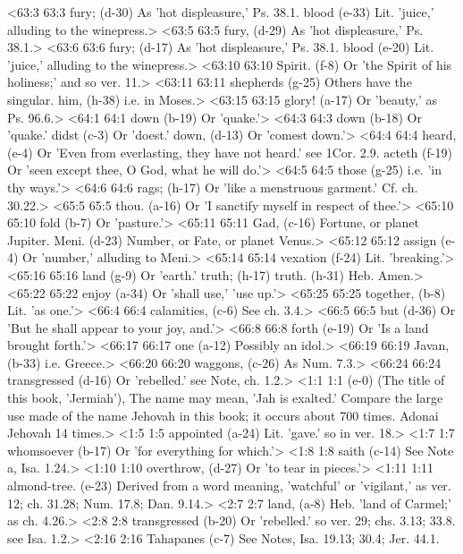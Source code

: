 <63:3 63:3  fury; (d-30)  As 'hot displeasure,' Ps. 38.1.
  blood (e-33)  Lit. 'juice,' alluding to the winepress.>
<63:5 63:5  fury, (d-29)  As 'hot displeasure,' Ps. 38.1.>
<63:6 63:6  fury; (d-17)  As 'hot displeasure,' Ps. 38.1.
  blood (e-20)  Lit. 'juice,' alluding to the winepress.>
<63:10 63:10  Spirit. (f-8)  Or 'the Spirit of his holiness;' and so ver. 11.>
<63:11 63:11  shepherds (g-25)  Others have the singular.
  him, (h-38)  i.e. in Moses.>
<63:15 63:15  glory! (a-17)  Or 'beauty,' as Ps. 96.6.>
<64:1 64:1  down (b-19)  Or 'quake.'>
<64:3 64:3  down (b-18)  Or 'quake.'
  didst (c-3)  Or 'doest.'
  down, (d-13)  Or 'comest down.'>
<64:4 64:4  heard, (e-4)  Or 'Even from everlasting, they have not heard.' see 1Cor. 2.9.
  acteth (f-19)  Or 'seen except thee, O God, what he will do.'>
<64:5 64:5  those (g-25)  i.e. 'in thy ways.'>
<64:6 64:6  rags; (h-17)  Or 'like a menstruous garment.' Cf. ch. 30.22.>
<65:5 65:5  thou. (a-16)  Or 'I sanctify myself in respect of thee.'>
<65:10 65:10  fold (b-7)  Or 'pasture.'>
<65:11 65:11  Gad, (c-16)  Fortune, or planet Jupiter.
  Meni. (d-23)  Number, or Fate, or planet Venus.>
<65:12 65:12  assign (e-4)  Or 'number,' alluding to Meni.>
<65:14 65:14  vexation (f-24)  Lit. 'breaking.'>
<65:16 65:16  land (g-9)  Or 'earth.'
  truth; (h-17)  truth. (h-31)
  Heb. Amen.>
<65:22 65:22  enjoy (a-34)  Or 'shall use,' 'use up.'>
<65:25 65:25  together, (b-8)  Lit. 'as one.'>
<66:4 66:4  calamities, (c-6)  See ch. 3.4.>
<66:5 66:5  but (d-36)  Or 'But he shall appear to your joy, and.'>
<66:8 66:8  forth (e-19)  Or 'Is a land brought forth.'>
<66:17 66:17  one (a-12)  Possibly an idol.>
<66:19 66:19  Javan, (b-33)  i.e. Greece.>
<66:20 66:20  waggons, (c-26)  As Num. 7.3.>
<66:24 66:24  transgressed (d-16)  Or 'rebelled.' see Note, ch. 1.2.>
<1:1 1:1   (e-0)  (The title of this book, 'Jermiah'), The name may mean, 'Jah  is exalted.' Compare the large use made of the name Jehovah  in this book; it occurs about 700 times. Adonai Jehovah 14  times.>
<1:5 1:5  appointed (a-24)  Lit. 'gave.' so in ver. 18.>
<1:7 1:7  whomsoever (b-17)  Or 'for everything for which.'>
<1:8 1:8  saith (c-14)  See Note a, Isa. 1.24.>
<1:10 1:10  overthrow, (d-27)  Or 'to tear in pieces.'>
<1:11 1:11  almond-tree. (e-23)  Derived from a word meaning, 'watchful' or 'vigilant,' as  ver. 12; ch. 31.28; Num. 17.8; Dan. 9.14.>
<2:7 2:7  land, (a-8)  Heb. 'land of Carmel;' as ch. 4.26.>
<2:8 2:8  transgressed (b-20)  Or 'rebelled.' so ver. 29; chs. 3.13; 33.8. see Isa. 1.2.>
<2:16 2:16  Tahapanes (c-7)  See Notes, Isa. 19.13; 30.4; Jer. 44.1.
